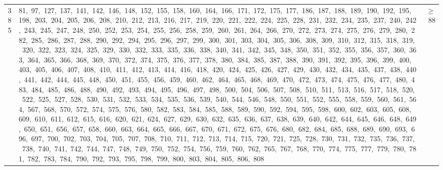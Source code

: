 \begin{longtable}{c|p{}|r}
385 & 81,\ 97,\ 127,\ 137,\ 141,\ 142,\ 146,\ 148,\ 152,\ 155,\ 158,\ 160,\ 164,\ 166,\ 171,\ 172,\ 175,\ 177,\ 186,\ 187,\ 188,\ 189,\ 190,\ 192,\ 195,\ 198,\ 203,\ 204,\ 205,\ 206,\ 208,\ 210,\ 212,\ 213,\ 216,\ 217,\ 219,\ 220,\ 221,\ 222,\ 224,\ 225,\ 228,\ 231,\ 232,\ 234,\ 235,\ 237,\ 240,\ 242,\ 243,\ 245,\ 247,\ 248,\ 250,\ 252,\ 253,\ 254,\ 255,\ 256,\ 258,\ 259,\ 260,\ 261,\ 264,\ 266,\ 270,\ 272,\ 273,\ 274,\ 275,\ 276,\ 279,\ 280,\ 282,\ 285,\ 286,\ 287,\ 288,\ 290,\ 292,\ 294,\ 295,\ 296,\ 297,\ 299,\ 300,\ 301,\ 303,\ 304,\ 305,\ 306,\ 308,\ 309,\ 310,\ 312,\ 315,\ 318,\ 319,\ 320,\ 322,\ 323,\ 324,\ 325,\ 329,\ 330,\ 332,\ 333,\ 335,\ 336,\ 338,\ 340,\ 341,\ 342,\ 345,\ 348,\ 350,\ 351,\ 352,\ 355,\ 356,\ 357,\ 360,\ 363,\ 364,\ 365,\ 366,\ 368,\ 369,\ 370,\ 372,\ 374,\ 375,\ 376,\ 377,\ 378,\ 380,\ 384,\ 385,\ 387,\ 388,\ 390,\ 391,\ 392,\ 395,\ 396,\ 399,\ 400,\ 403,\ 405,\ 406,\ 407,\ 408,\ 410,\ 411,\ 412,\ 413,\ 414,\ 416,\ 418,\ 420,\ 424,\ 425,\ 426,\ 427,\ 429,\ 430,\ 432,\ 434,\ 435,\ 437,\ 438,\ 440,\ 441,\ 442,\ 444,\ 445,\ 448,\ 450,\ 451,\ 455,\ 456,\ 459,\ 460,\ 462,\ 464,\ 465,\ 468,\ 469,\ 470,\ 472,\ 473,\ 474,\ 475,\ 476,\ 477,\ 480,\ 483,\ 484,\ 485,\ 486,\ 488,\ 490,\ 492,\ 493,\ 494,\ 495,\ 496,\ 497,\ 498,\ 500,\ 504,\ 506,\ 507,\ 508,\ 510,\ 511,\ 513,\ 516,\ 517,\ 518,\ 520,\ 522,\ 525,\ 527,\ 528,\ 530,\ 531,\ 532,\ 533,\ 534,\ 535,\ 536,\ 539,\ 540,\ 544,\ 546,\ 548,\ 550,\ 551,\ 552,\ 555,\ 558,\ 559,\ 560,\ 561,\ 564,\ 567,\ 568,\ 570,\ 572,\ 574,\ 575,\ 576,\ 580,\ 582,\ 583,\ 584,\ 585,\ 588,\ 589,\ 590,\ 592,\ 594,\ 595,\ 598,\ 600,\ 602,\ 603,\ 605,\ 608,\ 609,\ 610,\ 611,\ 612,\ 615,\ 616,\ 620,\ 621,\ 624,\ 627,\ 629,\ 630,\ 632,\ 635,\ 636,\ 637,\ 638,\ 639,\ 640,\ 642,\ 644,\ 645,\ 646,\ 648,\ 649,\ 650,\ 651,\ 656,\ 657,\ 658,\ 660,\ 663,\ 664,\ 665,\ 666,\ 667,\ 670,\ 671,\ 672,\ 675,\ 676,\ 680,\ 682,\ 684,\ 685,\ 688,\ 689,\ 690,\ 693,\ 696,\ 697,\ 700,\ 702,\ 703,\ 704,\ 705,\ 707,\ 708,\ 710,\ 711,\ 712,\ 713,\ 714,\ 715,\ 720,\ 721,\ 725,\ 728,\ 730,\ 731,\ 732,\ 735,\ 736,\ 737,\ 738,\ 740,\ 741,\ 742,\ 744,\ 747,\ 748,\ 749,\ 750,\ 752,\ 754,\ 756,\ 759,\ 760,\ 762,\ 765,\ 767,\ 768,\ 770,\ 774,\ 775,\ 777,\ 779,\ 780,\ 781,\ 782,\ 783,\ 784,\ 790,\ 792,\ 793,\ 795,\ 798,\ 799,\ 800,\ 803,\ 804,\ 805,\ 806,\ 808 & $\ge$ 88 \\

\end{longtable}

